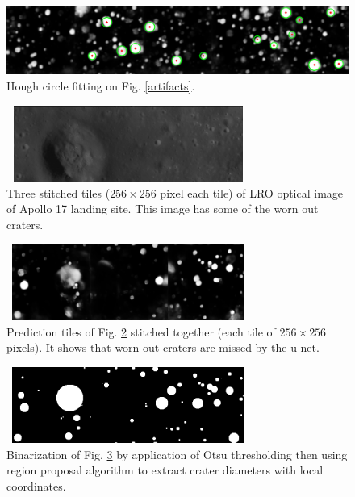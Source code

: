 \documentclass[11pt]{article}
\begin{document}
\begin{figure}[H]
	\centering
	\includegraphics[width=.8\textwidth]{files/results/with_circles.png}
	\caption{Hough circle fitting on Fig. \ref{artifacts}.}
	\label{hough_stitched}
\end{figure}

\begin{figure}[H]
	\centering
	\includegraphics[width=8cm, height=2.5cm]{files/results/big_crater.png}
	\caption{Three stitched tiles ($256 \times 256$ pixel each tile) of LRO optical image of Apollo 17 landing site. This image has some of the worn out craters.}
	\label{big}
\end{figure}

\begin{figure}[H]
	\centering
	\includegraphics[width=8cm, height=2.5cm]{files/results/exp.png}
	\caption{Prediction tiles of Fig. \ref{big} stitched together (each tile of $256 \times 256$ pixels). It shows that worn out craters are missed by the u-net.}
	\label{pr}
\end{figure}

\begin{figure}[H]
	\centering
	\includegraphics[width=8cm, height=2.5cm]{files/results/otsu_projection.png}
	\caption{Binarization of Fig. \ref{pr} by application of Otsu thresholding then using region proposal algorithm to extract crater diameters with local coordinates.}
	\label{otsu_pr}
\end{figure}
\end{document}
